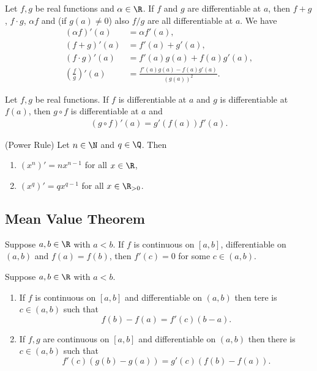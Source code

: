\documentclass{article}
\begin{document}
\begin{theorem}[Ross, 28.3]
    Let $f,g$ be real functions and $\alpha\in\R$. If $f$ and $g$ are
    differentiable at $a$, then $f+g$, $f\cdot g$, $\alpha f$ and
    (if $g(a)\not=0$) also $f/g$ are all differentiable at $a$. We have
    \begin{align*}
        (\alpha f)'(a)               & = \alpha f'(a),                        \\
        (f+g)'(a)                    & = f'(a) + g'(a),                       \\
        (f\cdot g)'(a)               & = f'(a)g(a)+f(a)g'(a),                 \\
        \left(\frac{f}{g}\right)'(a) & =\frac{f'(a)g(a)-f(a)g'(a)}{(g(a))^2}.
    \end{align*}
\end{theorem}

\begin{theorem}[Ross, 28.4]
    Let $f,g$ be real functions. If $f$ is differentiable at $a$ and $g$ is
    differentiable at $f(a)$, then $g\circ f$ is differentiable at $a$ and
    \begin{align*}
        (g\circ f)'(a) = g'(f(a))f'(a).
    \end{align*}
\end{theorem}

\begin{theorem}(Power Rule)
    Let $n\in \N$ and $q\in\Q$. Then
    \begin{enumerate}[label=(\arabic*)]
        \item $(x^n)'=nx^{n-1}$ for all $x\in\R$,
        \item $(x^q)'=qx^{q-1}$ for all $x\in\R_{>0}$.
    \end{enumerate}
\end{theorem}

\subsection{Mean Value Theorem}

\begin{theorem}
    Suppose $a,b\in\R$ with $a<b$. If $f$ is continuous on $[a,b]$,
    differentiable on $(a,b)$ and $f(a)=f(b)$, then $f'(c)=0$ for some
    $c\in(a,b)$.
\end{theorem}

\begin{theorem}
    Suppose $a,b\in\R$ with $a<b$.
    \begin{enumerate}
        \item If $f$ is continuous on $[a,b]$ and differentiable on $(a,b)$
              then tere is $c\in(a,b)$ such that \[f(b)-f(a)=f'(c)(b-a).\]
        \item If $f,g$ are continuous on $[a,b]$ and differentiable on $(a,b)$
              then there is $c\in(a,b)$ such that
              \[f'(c)(g(b)-g(a))=g'(c)(f(b)-f(a)).\]
    \end{enumerate}
\end{theorem}
\end{document}

